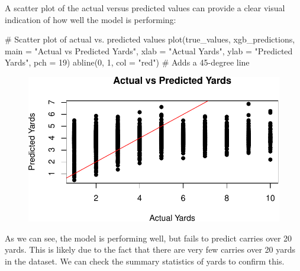 \documentclass[
  super,
  preprint,
  3p]{elsarticle}
\newenvironment{Shaded}{\begin{snugshade}}{\end{snugshade}}
\newcommand{\AttributeTok}[1]{\textcolor[rgb]{0.40,0.45,0.13}{#1}}
\newcommand{\CommentTok}[1]{\textcolor[rgb]{0.37,0.37,0.37}{#1}}
\newcommand{\DecValTok}[1]{\textcolor[rgb]{0.68,0.00,0.00}{#1}}
\newcommand{\FunctionTok}[1]{\textcolor[rgb]{0.28,0.35,0.67}{#1}}
\newcommand{\NormalTok}[1]{\textcolor[rgb]{0.00,0.23,0.31}{#1}}
\newcommand{\SpecialCharTok}[1]{\textcolor[rgb]{0.37,0.37,0.37}{#1}}
\newcommand{\StringTok}[1]{\textcolor[rgb]{0.13,0.47,0.30}{#1}}
\begin{document}
A scatter plot of the actual versus predicted values can provide a clear
visual indication of how well the model is performing:

\begin{Shaded}
\begin{Highlighting}[]
\CommentTok{\# Scatter plot of actual vs. predicted values}
\FunctionTok{plot}\NormalTok{(true\_values, xgb\_predictions, }\AttributeTok{main =} \StringTok{"Actual vs Predicted Yards"}\NormalTok{, }\AttributeTok{xlab =} \StringTok{"Actual Yards"}\NormalTok{, }\AttributeTok{ylab =} \StringTok{"Predicted Yards"}\NormalTok{, }\AttributeTok{pch =} \DecValTok{19}\NormalTok{)}
\FunctionTok{abline}\NormalTok{(}\DecValTok{0}\NormalTok{, }\DecValTok{1}\NormalTok{, }\AttributeTok{col =} \StringTok{"red"}\NormalTok{)  }\CommentTok{\# Adds a 45{-}degree line}
\end{Highlighting}
\end{Shaded}

\begin{figure}[H]

{\centering \includegraphics{project_report_files/figure-pdf/unnamed-chunk-33-1.pdf}

}

\end{figure}

As we can see, the model is performing well, but fails to predict
carries over 20 yards. This is likely due to the fact that there are
very few carries over 20 yards in the dataset. We can check the summary
statistics of yards to confirm this.

\begin{Shaded}
\end{Shaded}
\end{document}
